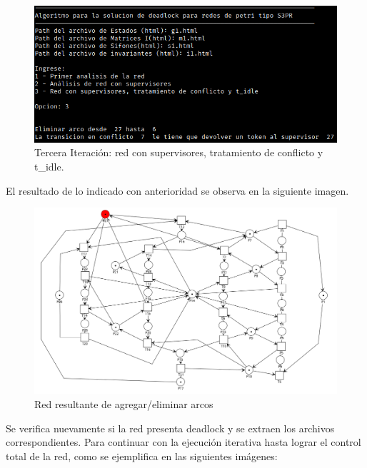 \begin{figure} [H]
    \centering
    \includegraphics[width=\textwidth]{Figures/apendiceB/Py-POPN5.png}
    \caption{Tercera Iteración: red con supervisores, tratamiento de conflicto y t\_idle.}
    \label{fig:b-popn5}
\end{figure}

\noindent El resultado de lo indicado con anterioridad se observa en la siguiente imagen.

\begin{figure} [H]
    \centering
    \includegraphics[width=\textwidth]{Figures/apendiceB/eliminacion-arco.png}
    \caption{Red resultante de agregar/eliminar arcos}
    \label{fig:b-supervisor1}
\end{figure}

Se verifica nuevamente si la red presenta deadlock y se extraen los archivos correspondientes. Para continuar con la ejecución iterativa hasta lograr el control total de la red, como se ejemplifica en las siguientes imágenes:  

